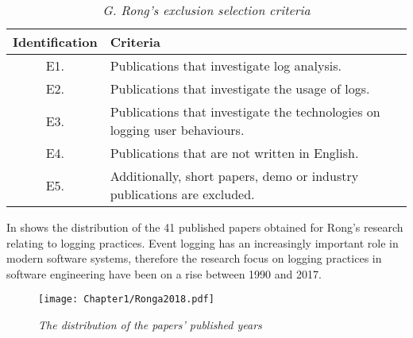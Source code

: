\begin{table}[!htb]
	\centering
	\caption[G. Rong's exclusion selection criteria]
	{\textit{G. Rong's exclusion selection criteria \cite{Rong2018a}}}
	\label{tbl:CH1_RongExlSelectionCriteria}
	\begin{tabularx}{\textwidth}{|c|X|}
		\hline \textbf{Identification} & \textbf{Criteria} \\
		\hline E1. & Publications that investigate log analysis. \\
		\hline E2. & Publications that investigate the usage of logs. \\
		\hline E3. & Publications that investigate the technologies on logging user behaviours. \\
		\hline E4. & Publications that are not written in English. \\
		\hline E5. & Additionally, short papers, demo or industry publications are excluded. \\
		\hline
	\end{tabularx}
\end{table}

\clearpage

In  shows the distribution of the 41 published papers obtained for Rong's research relating to logging practices. Event logging has an increasingly important role in modern software systems, therefore the research focus on logging practices in software engineering have been on a rise between 1990 and 2017.

\begin{figure}[!htb] %
	\centering %
	\texttt{[image: Chapter1/Ronga2018.pdf]}
	\caption[The distribution of the papers’ published years]
	{\textit{The distribution of the papers’ published years \cite{Rong2018a}}} \label{fig:PushblisedPapers}
\end{figure} 
